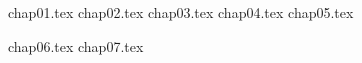 \documentclass[
]{ctexbook}
\begin{document}


% 
% 

\setcounter{secnumdepth}{4}
\setcounter{tocdepth}{4}
\tableofcontents
% 


% 
% 

% 
% 
% 

{chap01.tex}
{chap02.tex}
{chap03.tex}
{chap04.tex}
{chap05.tex}


{chap06.tex}
{chap07.tex}
\end{document}
